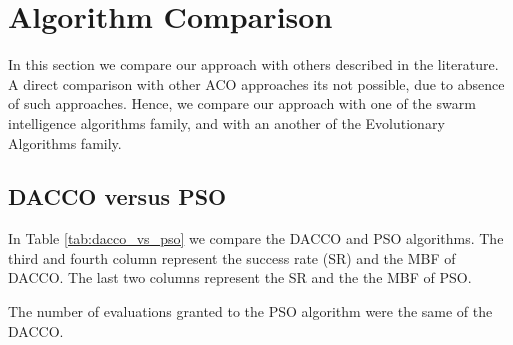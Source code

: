 	\section{Algorithm Comparison}
	In this section we compare our approach with others described in the literature. A direct comparison with other ACO approaches its not possible, due to absence of such approaches. Hence, we compare our approach with one of the swarm intelligence algorithms family, and with an another of the Evolutionary Algorithms family.
	\subsection{DACCO versus PSO}
	In Table \ref{tab:dacco_vs_pso} we compare the DACCO and PSO algorithms. The third and fourth column represent the success rate (SR) and the MBF of DACCO. The last two columns represent the SR and the the MBF of PSO. 
	
	The number of evaluations granted to the PSO algorithm were the same of the DACCO. 
	
